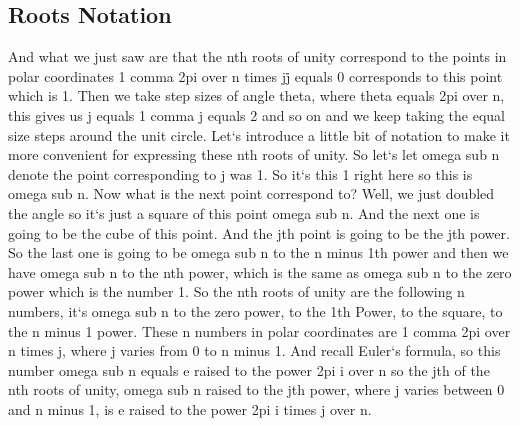 \subsection{Roots  Notation}
And what we just saw are that the nth roots of unity correspond to the points in polar coordinates 1 comma 2pi over n times j\. j equals 0 corresponds to this point which is 1.
Then we take step sizes of angle theta, where theta equals 2pi over n, this gives us j equals 1 comma j equals 2 and so on and we keep taking the equal size steps around the unit circle.
Let`s introduce a little bit of notation to make it more convenient for expressing these nth roots of unity.
So let`s let omega sub n denote the point corresponding to j was 1.
So it`s this 1 right here so this is omega sub n.
Now what is the next point correspond to? Well, we just doubled the angle so it`s just a square of this point omega sub n.
And the next one is going to be the cube of this point.
And the jth point is going to be the jth power.
So the last one is going to be omega sub n to the n minus 1th power and then we have omega sub n to the nth power, which is the same as omega sub n to the zero power which is the number 1.
So the nth roots of unity are the following n numbers, it`s omega sub n to the zero power, to the 1th Power, to the square, to the n minus 1 power.
These n numbers in polar coordinates are 1 comma 2pi over n times j, where j varies from 0 to n minus 1.
And recall Euler`s formula, so this number omega sub n equals e raised to the power 2pi i over n so the jth of the nth roots of unity, omega sub n raised to the jth power, where j varies between 0 and n minus 1, is e raised to the power 2pi i times j over n.

